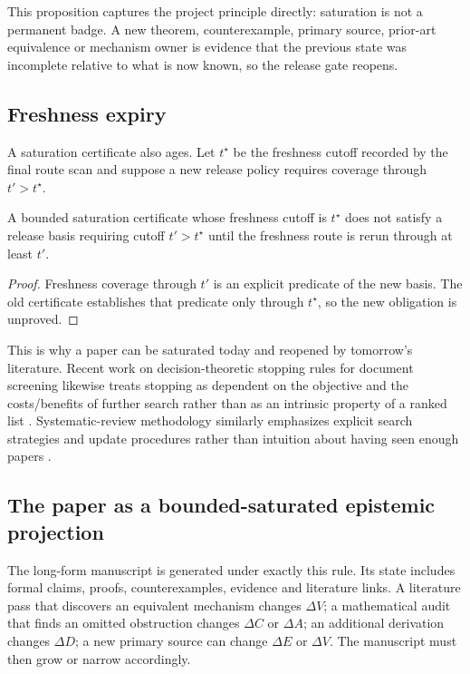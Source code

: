 This proposition captures the project principle directly: saturation is not a permanent badge. A new theorem, counterexample, primary source, prior-art equivalence or mechanism owner is evidence that the previous state was incomplete relative to what is now known, so the release gate reopens.

\subsection{Freshness expiry}

A saturation certificate also ages. Let \(t^\star\) be the freshness cutoff recorded by the final route scan and suppose a new release policy requires coverage through \(t'>t^\star\).

\begin{proposition}
A bounded saturation certificate whose freshness cutoff is \(t^\star\) does not satisfy a release basis requiring cutoff \(t'>t^\star\) until the freshness route is rerun through at least \(t'\).
\end{proposition}

\begin{proof}
Freshness coverage through \(t'\) is an explicit predicate of the new basis. The old certificate establishes that predicate only through \(t^\star\), so the new obligation is unproved.
\end{proof}

This is why a paper can be saturated today and reopened by tomorrow's literature. Recent work on decision-theoretic stopping rules for document screening likewise treats stopping as dependent on the objective and the costs/benefits of further search rather than as an intrinsic property of a ranked list \cite{fletcher2026}. Systematic-review methodology similarly emphasizes explicit search strategies and update procedures rather than intuition about having seen enough papers \cite{macfarlane2022}.

\subsection{The paper as a bounded-saturated epistemic projection}

The long-form manuscript is generated under exactly this rule. Its state includes formal claims, proofs, counterexamples, evidence and literature links. A literature pass that discovers an equivalent mechanism changes \(\Delta V\); a mathematical audit that finds an omitted obstruction changes \(\Delta C\) or \(\Delta A\); an additional derivation changes \(\Delta D\); a new primary source can change \(\Delta E\) or \(\Delta V\). The manuscript must then grow or narrow accordingly.

